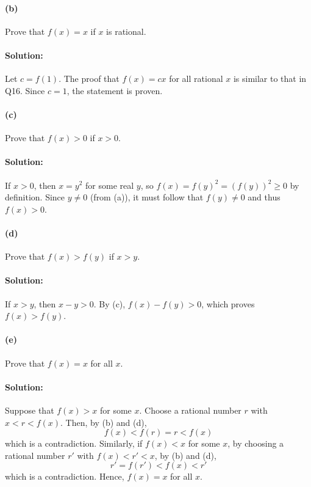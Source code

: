 \documentclass{article}
\begin{document}
\paragraph{(b)} Prove that $f(x) = x$ if $x$ is rational.

\paragraph{Solution:} Let $c = f(1)$. The proof that $f(x) = cx$ for all
rational $x$ is similar to that in Q16. Since $c = 1$, the statement is proven.

\paragraph{(c)} Prove that $f(x) > 0$ if $x > 0$.

\paragraph{Solution:} If $x > 0$, then $x = y^2$ for some real $y$, so $f(x) =
f(y)^2 = (f(y))^2 \geq 0$ by definition. Since $y \neq 0$ (from (a)), it must
follow that $f(y) \neq 0$ and thus $f(x) > 0$.

\paragraph{(d)} Prove that $f(x) > f(y)$ if $x > y$.

\paragraph{Solution:} If $x > y$, then $x - y > 0$. By (c), $f(x) - f(y) > 0$,
which proves $f(x) > f(y)$.

\paragraph{(e)} Prove that $f(x) = x$ for all $x$.

\paragraph{Solution:} Suppose that $f(x) > x$ for some $x$. Choose a rational
number $r$ with $x < r < f(x)$. Then, by (b) and (d), \begin{equation*}
  f(x) < f(r) = r < f(x)
\end{equation*} which is a contradiction. Similarly, if $f(x) < x$ for some
$x$, by choosing a rational number $r'$ with $f(x) < r' < x$, by (b) and (d),
\begin{equation*}
  r' = f(r') < f(x) < r'
\end{equation*} which is a contradiction. Hence, $f(x) = x$ for all $x$.
\end{document}

